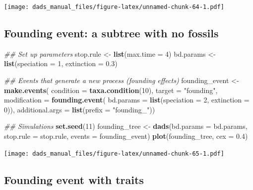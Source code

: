 \documentclass[]{book}
\newenvironment{Shaded}{\begin{snugshade}}{\end{snugshade}}
\newcommand{\CommentTok}[1]{\textcolor[rgb]{0.56,0.35,0.01}{\textit{#1}}}
\newcommand{\DataTypeTok}[1]{\textcolor[rgb]{0.13,0.29,0.53}{#1}}
\newcommand{\DecValTok}[1]{\textcolor[rgb]{0.00,0.00,0.81}{#1}}
\newcommand{\FloatTok}[1]{\textcolor[rgb]{0.00,0.00,0.81}{#1}}
\newcommand{\KeywordTok}[1]{\textcolor[rgb]{0.13,0.29,0.53}{\textbf{#1}}}
\newcommand{\NormalTok}[1]{#1}
\newcommand{\StringTok}[1]{\textcolor[rgb]{0.31,0.60,0.02}{#1}}
\begin{document}
\texttt{[image: dads\_manual\_files/figure-latex/unnamed-chunk-64-1.pdf]}

\hypertarget{founding-event-a-subtree-with-no-fossils}{%
\subsection{Founding event: a subtree with no fossils}\label{founding-event-a-subtree-with-no-fossils}}

\begin{Shaded}
\begin{Highlighting}[]
\CommentTok{## Set up parameters}
\NormalTok{stop.rule <-}\StringTok{ }\KeywordTok{list}\NormalTok{(}\DataTypeTok{max.time =} \DecValTok{4}\NormalTok{)}
\NormalTok{bd.params <-}\StringTok{ }\KeywordTok{list}\NormalTok{(}\DataTypeTok{speciation =} \DecValTok{1}\NormalTok{, }\DataTypeTok{extinction =} \FloatTok{0.3}\NormalTok{)}

\CommentTok{## Events that generate a new process (founding effects)}
\NormalTok{founding_event <-}\StringTok{ }\KeywordTok{make.events}\NormalTok{(}
                  \DataTypeTok{condition    =} \KeywordTok{taxa.condition}\NormalTok{(}\DecValTok{10}\NormalTok{),}
                  \DataTypeTok{target       =} \StringTok{"founding"}\NormalTok{,}
                  \DataTypeTok{modification =} \KeywordTok{founding.event}\NormalTok{(}
                                    \DataTypeTok{bd.params =} \KeywordTok{list}\NormalTok{(}\DataTypeTok{speciation =} \DecValTok{2}\NormalTok{,}
                                                     \DataTypeTok{extinction =} \DecValTok{0}\NormalTok{)),}
                  \DataTypeTok{additional.args =} \KeywordTok{list}\NormalTok{(}\DataTypeTok{prefix =} \StringTok{"founding_"}\NormalTok{))}
    
\CommentTok{## Simulations}
\KeywordTok{set.seed}\NormalTok{(}\DecValTok{11}\NormalTok{)}
\NormalTok{founding_tree <-}\StringTok{ }\KeywordTok{dads}\NormalTok{(}\DataTypeTok{bd.params =}\NormalTok{ bd.params,}
                      \DataTypeTok{stop.rule =}\NormalTok{ stop.rule,}
                      \DataTypeTok{events    =}\NormalTok{ founding_event)}
\KeywordTok{plot}\NormalTok{(founding_tree, }\DataTypeTok{cex =} \FloatTok{0.4}\NormalTok{)}
\end{Highlighting}
\end{Shaded}

\texttt{[image: dads\_manual\_files/figure-latex/unnamed-chunk-65-1.pdf]}

\hypertarget{founding-event-with-traits}{%
\subsection{Founding event with traits}\label{founding-event-with-traits}}
\end{document}
